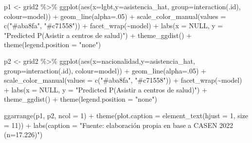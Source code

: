 \documentclass[
  12pt,
  a4paper,
]{article}
\newenvironment{Shaded}{\begin{snugshade}}{\end{snugshade}}
\newcommand{\AttributeTok}[1]{\textcolor[rgb]{0.77,0.63,0.00}{#1}}
\newcommand{\ConstantTok}[1]{\textcolor[rgb]{0.00,0.00,0.00}{#1}}
\newcommand{\DecValTok}[1]{\textcolor[rgb]{0.00,0.00,0.81}{#1}}
\newcommand{\FunctionTok}[1]{\textcolor[rgb]{0.00,0.00,0.00}{#1}}
\newcommand{\NormalTok}[1]{#1}
\newcommand{\OtherTok}[1]{\textcolor[rgb]{0.56,0.35,0.01}{#1}}
\newcommand{\SpecialCharTok}[1]{\textcolor[rgb]{0.00,0.00,0.00}{#1}}
\newcommand{\StringTok}[1]{\textcolor[rgb]{0.31,0.60,0.02}{#1}}
\begin{document}
\begin{Shaded}
\begin{Highlighting}[]
\NormalTok{p1 }\OtherTok{\textless{}{-}}\NormalTok{ grid2 }\SpecialCharTok{\%\textgreater{}\%} 
  \FunctionTok{ggplot}\NormalTok{(}\FunctionTok{aes}\NormalTok{(}\AttributeTok{x=}\NormalTok{lgbt,}\AttributeTok{y=}\NormalTok{asistencia\_hat, }\AttributeTok{group=}\FunctionTok{interaction}\NormalTok{(.id), }\AttributeTok{colour=}\NormalTok{model)) }\SpecialCharTok{+}
  \FunctionTok{geom\_line}\NormalTok{(}\AttributeTok{alpha=}\NormalTok{.}\DecValTok{05}\NormalTok{) }\SpecialCharTok{+}
  \FunctionTok{scale\_color\_manual}\NormalTok{(}\AttributeTok{values =} \FunctionTok{c}\NormalTok{(}\StringTok{"\#aba8fa"}\NormalTok{, }\StringTok{"\#c71558"}\NormalTok{)) }\SpecialCharTok{+}
  \FunctionTok{facet\_wrap}\NormalTok{(}\SpecialCharTok{\textasciitilde{}}\NormalTok{model) }\SpecialCharTok{+}
  \FunctionTok{labs}\NormalTok{(}\AttributeTok{x =} \ConstantTok{NULL}\NormalTok{,}
       \AttributeTok{y =} \StringTok{"Predicted P(Asistir a centros de salud)"}\NormalTok{) }\SpecialCharTok{+}
  \FunctionTok{theme\_ggdist}\NormalTok{() }\SpecialCharTok{+}
  \FunctionTok{theme}\NormalTok{(}\AttributeTok{legend.position =} \StringTok{"none"}\NormalTok{)}


\NormalTok{p2 }\OtherTok{\textless{}{-}}\NormalTok{ grid2 }\SpecialCharTok{\%\textgreater{}\%} 
  \FunctionTok{ggplot}\NormalTok{(}\FunctionTok{aes}\NormalTok{(}\AttributeTok{x=}\NormalTok{nacionalidad,}\AttributeTok{y=}\NormalTok{asistencia\_hat, }\AttributeTok{group=}\FunctionTok{interaction}\NormalTok{(.id), }\AttributeTok{colour=}\NormalTok{model)) }\SpecialCharTok{+}
  \FunctionTok{geom\_line}\NormalTok{(}\AttributeTok{alpha=}\NormalTok{.}\DecValTok{05}\NormalTok{) }\SpecialCharTok{+}
  \FunctionTok{scale\_color\_manual}\NormalTok{(}\AttributeTok{values =} \FunctionTok{c}\NormalTok{(}\StringTok{"\#aba8fa"}\NormalTok{, }\StringTok{"\#c71558"}\NormalTok{)) }\SpecialCharTok{+}
  \FunctionTok{facet\_wrap}\NormalTok{(}\SpecialCharTok{\textasciitilde{}}\NormalTok{model) }\SpecialCharTok{+}
  \FunctionTok{labs}\NormalTok{(}\AttributeTok{x =} \ConstantTok{NULL}\NormalTok{,}
       \AttributeTok{y =} \StringTok{"Predicted P(Asistir a centros de salud)"}\NormalTok{) }\SpecialCharTok{+}
  \FunctionTok{theme\_ggdist}\NormalTok{() }\SpecialCharTok{+}
  \FunctionTok{theme}\NormalTok{(}\AttributeTok{legend.position =} \StringTok{"none"}\NormalTok{)}
  
\FunctionTok{ggarrange}\NormalTok{(p1, p2, }
          \AttributeTok{ncol =} \DecValTok{1}\NormalTok{) }\SpecialCharTok{+}
  \FunctionTok{theme}\NormalTok{(}\AttributeTok{plot.caption =} \FunctionTok{element\_text}\NormalTok{(}\AttributeTok{hjust =} \DecValTok{1}\NormalTok{, }\AttributeTok{size =} \DecValTok{11}\NormalTok{)) }\SpecialCharTok{+}
  \FunctionTok{labs}\NormalTok{(}\AttributeTok{caption =} \StringTok{"Fuente: elaboración propia en base a CASEN 2022 (n=17.226)"}\NormalTok{)}
\end{Highlighting}
\end{Shaded}
\end{document}
